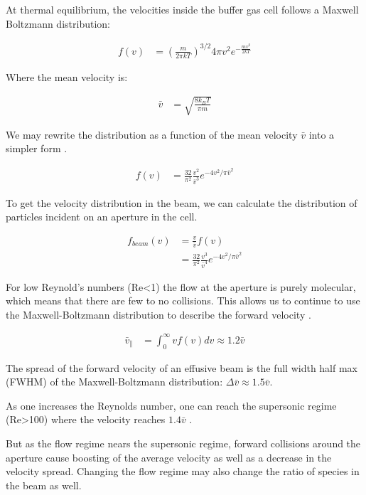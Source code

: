 \documentclass[a4paper]{article}
\begin{document}
At thermal equilibrium, the velocities inside the buffer gas cell follows a Maxwell Boltzmann distribution:

\begin{align} \label{e: mb_distribution}
f(v) & = \left(\frac{m}{2 \pi k T}\right)^{3/2}4 \pi v^2 e^{-\frac{m v^2}{2 k T}}
\end{align}

Where the mean velocity is:

\begin{align} \label{e: mb_mean}
\bar{v} & = \sqrt{\frac{8 k_B T}{\pi m}}
\end{align}

We may rewrite the distribution as a function of the mean velocity $\bar{v}$ into a simpler form .

\begin{align} \label{e: mb_simplified}
f(v) & = \frac{32}{\pi^2} \frac{v^2}{\bar{v}^3} e^{-4v^2/\pi \bar{v}^2}
\end{align}

To get the velocity distribution in the beam, we can calculate the distribution of particles incident on an aperture in the cell.

\begin{align}
f_{beam}(v) & = \frac{v}{\bar{v}}f(v)  \\
& = \frac{32}{\pi^2} \frac{v^3}{\bar{v}^4} e^{-4v^2/\pi \bar{v}^2}
\end{align}

For low Reynold's numbers (Re<1) the flow at the aperture is purely molecular, which means that there are few to no collisions. This allows us to continue to use the Maxwell-Boltzmann distribution to describe the forward velocity \cite{Hutzler2011c}.

\begin{align}
\bar{v}_\parallel & = \int_0^\infty v f(v) dv \approx 1.2 \bar{v}
\end{align}

The spread of the forward velocity of an effusive beam is the full width half max (FWHM) of the Maxwell-Boltzmann distribution: $\Delta\bar{v} \approx 1.5 \bar{v}$.

As one increases the Reynolds number, one can reach the supersonic regime (Re>100) where the velocity reaches $1.4\bar{v}$ \cite{Hutzler2011c}.

But as the flow regime nears the supersonic regime, forward collisions around the aperture cause boosting of the average velocity as well as a decrease in the velocity spread. Changing the flow regime may also change the ratio of species in the beam as well.
\end{document}
